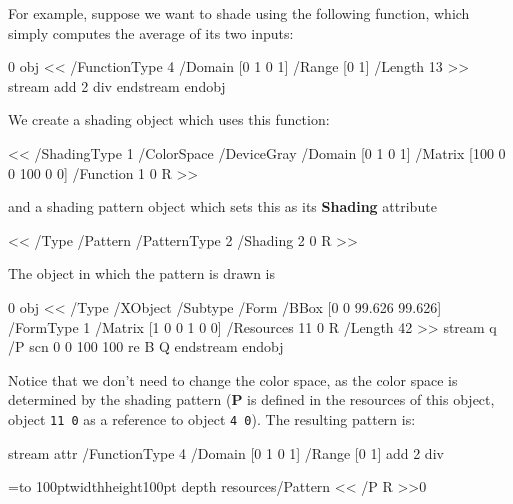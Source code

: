 For example, suppose we want to shade using the following function, which simply computes the average of its
two inputs:

 0 obj
<<
    /FunctionType 4
    /Domain [0 1 0 1]
    /Range [0 1] 
    /Length 13        
>>
stream
{
    add
    2 div
}
endstream
endobj
\elisting

\noindent We create a shading object which uses this function:

\blisting
<<
    /ShadingType 1              %
    /ColorSpace /DeviceGray     %
    /Domain [0 1 0 1]           %
    /Matrix [100 0 0 100 0 0]   %
    /Function 1 0 R             %
>> 
\elisting

\noindent and a shading pattern object which sets this as its {\bf Shading} attribute

\blisting
<<
    /Type /Pattern  %
    /PatternType 2  %
    /Shading 2 0 R  %
>> 
\elisting

\noindent The object in which the pattern is drawn is

 0 obj
<<
    /Type /XObject
    /Subtype /Form
    /BBox [0 0 99.626 99.626]
    /FormType 1
    /Matrix [1 0 0 1 0 0]
    /Resources 11 0 R
    /Length 42        
>>
stream
q
/P scn          %
0 0 100 100 re  %
B               %
Q 
endstream
endobj
\elisting

\noindent Notice that we don't need to change the color space, as the color space is determined by the
shading pattern ({\bf P} is defined in the resources of this object, object {\tt11 0} as a reference to object
{\tt4 0}).
The resulting pattern is:

\bgroup
\immediate\pdfobj stream attr{
    /FunctionType 4
    /Domain [0 1 0 1]
    /Range [0 1]
}{{
    add
    2 div
}}

\immediate{}

\immediate{}

=\hbox to 100pt{\vrule width\z@ height100pt depth\z@%
    \hfil%
}
\pdfxform resources{/Pattern << /P \the\pdflastobj{} R >>}0

